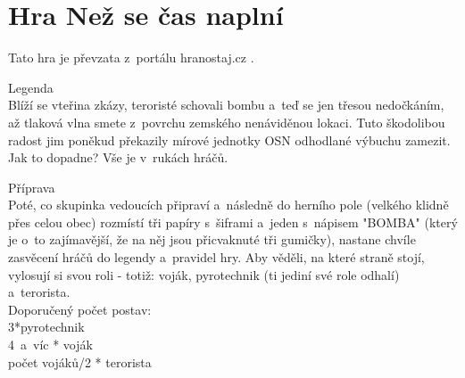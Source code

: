 
\section{Hra Než se čas naplní}
Tato hra je převzata z~portálu hranostaj.cz \cite{NezSeCasNaplni}.

Legenda\\
Blíží se vteřina zkázy, teroristé schovali bombu a~teď se jen třesou nedočkáním, až tlaková vlna smete z~povrchu zemského nenáviděnou lokaci. Tuto škodolibou radost jim poněkud překazily mírové jednotky OSN odhodlané výbuchu zamezit. Jak to dopadne? Vše je v~rukách hráčů.

Příprava\\
Poté, co skupinka vedoucích připraví a~následně do herního pole (velkého klidně přes celou obec) rozmístí tři papíry s~šiframi a~jeden s~nápisem "BOMBA" (který je o~to zajímavější, že na něj jsou přicvaknuté tři gumičky), nastane chvíle zasvěcení hráčů do legendy a~pravidel hry. Aby věděli, na které straně stojí, vylosují si svou roli - totiž: voják, pyrotechnik (ti jediní své role odhalí) a~terorista.\\
Doporučený počet postav:\\
3*pyrotechnik\\
4~a~víc * voják\\
počet vojáků/2 * terorista\\

